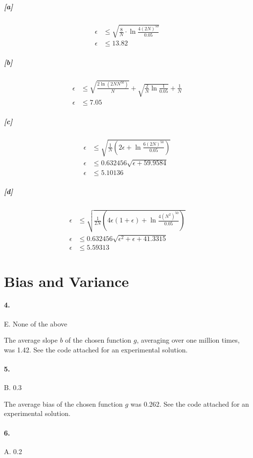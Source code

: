 \documentclass[10pt,letter]{article}
\begin{document}
	\subparagraph{[a]}
		\begin{align*}
		\epsilon &\leq \sqrt{\frac{8}{N} \cdot \ln{\frac{4(2N)^{50}}{0.05}} } \\
		\epsilon &\leq 13.82
		\end{align*}
	\subparagraph{[b]}
		\begin{align*}
		\epsilon &\leq \sqrt{\frac{2\ln(2N N^{50} )}{N}} + \sqrt{\frac{2}{N} \ln{\frac{1}{0.05}}} + \frac{1}{N} \\
		\epsilon &\leq 7.05
		\end{align*}
	\subparagraph{[c]}
		\begin{align*}
		\epsilon &\leq \sqrt{\frac{1}{N}(2\epsilon + \ln\frac{6 (2N)^{50} }{0.05} )} \\
		\epsilon &\leq 0.632456 \sqrt{\epsilon+59.9584} \\
		\epsilon &\leq 5.10136
		\end{align*}
	\subparagraph{[d]} 
		\begin{align*}
		\epsilon &\leq \sqrt{\frac{1}{2N} (4\epsilon(1 +\epsilon) + \ln\frac{4 (N^2)^{50} }{0.05} ) } \\
		\epsilon &\leq 0.632456 \sqrt{\epsilon^2+\epsilon+41.3315} \\
		\epsilon &\leq 5.59313
		\end{align*}

\section*{Bias and Variance}

\paragraph{4.} E. None of the above

	The average slope $b$ of the chosen function $g$, averaging over one million times, was 1.42. See the code attached for an experimental solution.

\paragraph{5.} B. 0.3

	The average bias of the chosen function $g$ was 0.262. See the code attached for an experimental solution.

\paragraph{6.} A. 0.2
\end{document}
